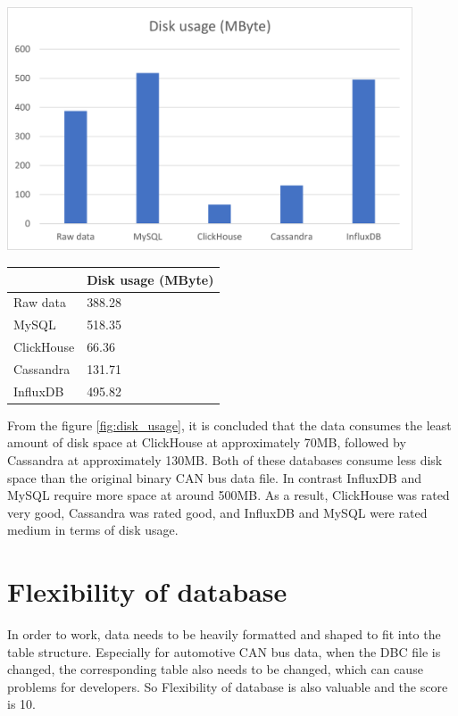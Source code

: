 \begin{minipage}[hbt!]{\textwidth}
  \begin{minipage}[b]{0.49\textwidth}
    \centering
    \includegraphics[width=0.9\textwidth]{gfx/disk_usage.png}
    \label{fig:disk_usage}
  \end{minipage}
  \hfill
  \begin{minipage}[b]{0.49\textwidth}
    \centering
   \begin{tabular}{@{}ll@{}}
\toprule
           & Disk usage (MByte)  \\ \midrule
Raw data   & 388.28 \\
MySQL      & 518.35 \\
ClickHouse & 66.36 \\
Cassandra  & 131.71 \\
InfluxDB   & 495.82 \\ \bottomrule
    \end{tabular}
    \end{minipage}
  \end{minipage}

From the figure \ref{fig:disk_usage}, it is concluded that the data consumes the least amount of disk space at ClickHouse at approximately 70MB, followed by Cassandra at approximately 130MB. Both of these databases consume less disk space than the original binary CAN bus data file. In contrast InfluxDB and MySQL require more space at around 500MB. As a result, ClickHouse was rated very good, Cassandra was rated good, and InfluxDB and MySQL were rated medium in terms of disk usage.

\section{Flexibility of database}
In order to work, data needs to be heavily formatted and shaped to fit into the table structure\cite{mongodb}. Especially for automotive CAN bus data, when the DBC file is changed, the corresponding table also needs to be changed, which can cause problems for developers. So Flexibility of database is also valuable and the score is 10.

